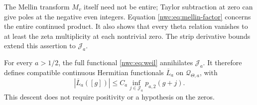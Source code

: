 The Mellin transform $M_v$ itself need not be entire; Taylor subtraction
at zero can give poles at the negative even integers.
Equation \eqref{nwc:eq:mellin-factor} concerns the entire continued
product. It also shows that every theta relation vanishes to at least
the zeta multiplicity at each nontrivial zero. The strip derivative
bounds extend this assertion to $\mathcal J_a$.

\begin{theorem}
For every $a>1/2$,\label{nwc:thm:descent} the full functional \eqref{nwc:eq:weil} annihilates
$\mathcal J_a$. It therefore defines compatible continuous Hermitian
functionals $\overline L_a$ on $\mathcal Q_{\Theta,a}$, with
\[
 |\overline L_a([g])|\leq C_a\inf_{j\in\mathcal J_a}p_{a,2}(g+j).
\]
This descent does not require positivity or a hypothesis on the zeros.
\end{theorem}
